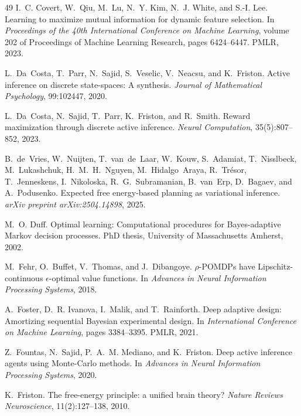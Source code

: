 \documentclass[runningheads]{llncs}
\begin{document}
\begin{thebibliography}{49}
I.~C. Covert, W.~Qiu, M.~Lu, N.~Y. Kim, N.~J. White, and S.-I. Lee.
\newblock Learning to maximize mutual information for dynamic feature selection.
\newblock In \emph{Proceedings of the 40th International Conference on Machine Learning}, volume 202 of Proceedings of Machine Learning Research, pages 6424--6447. PMLR, 2023.

L.~Da~Costa, T.~Parr, N.~Sajid, S.~Veselic, V.~Neacsu, and K.~Friston.
\newblock Active inference on discrete state-spaces: A synthesis.
\newblock \emph{Journal of Mathematical Psychology}, 99:102447, 2020.

L.~Da~Costa, N.~Sajid, T.~Parr, K.~Friston, and R.~Smith.
\newblock Reward maximization through discrete active inference.
\newblock \emph{Neural Computation}, 35(5):807--852, 2023.

B.~de~Vries, W.~Nuijten, T.~van~de~Laar, W.~Kouw, S.~Adamiat,
T.~Nisslbeck, M.~Lukashchuk, H.~M.~H.~Nguyen, M.~Hidalgo~Araya,
R.~Tr{\'e}sor, T.~Jenneskens, I.~Nikoloska, R.~G.~Subramanian,
B.~van~Erp, D.~Bagaev, and A.~Podusenko.
\newblock Expected free energy-based planning as variational inference.
\newblock \emph{arXiv preprint arXiv:2504.14898}, 2025.

M.~O. Duff.
\newblock Optimal learning: Computational procedures for {B}ayes-adaptive {M}arkov decision processes.
\newblock PhD thesis, University of Massachusetts Amherst, 2002.

M.~Fehr, O.~Buffet, V.~Thomas, and J.~Dibangoye.
\newblock $\rho$-{POMDP}s have {L}ipschitz-continuous $\epsilon$-optimal value functions.
\newblock In \emph{Advances in Neural Information Processing Systems}, 2018.

A.~Foster, D.~R. Ivanova, I.~Malik, and T.~Rainforth.
\newblock Deep adaptive design: Amortizing sequential {B}ayesian experimental design.
\newblock In \emph{International Conference on Machine Learning}, pages 3384--3395. PMLR, 2021.

Z.~Fountas, N.~Sajid, P.~A.~M. Mediano, and K.~Friston.
\newblock Deep active inference agents using {M}onte-{C}arlo methods.
\newblock In \emph{Advances in Neural Information Processing Systems}, 2020.

K.~Friston.
\newblock The free-energy principle: a unified brain theory?
\newblock \emph{Nature Reviews Neuroscience}, 11(2):127--138, 2010.


\end{thebibliography}
\end{document}
